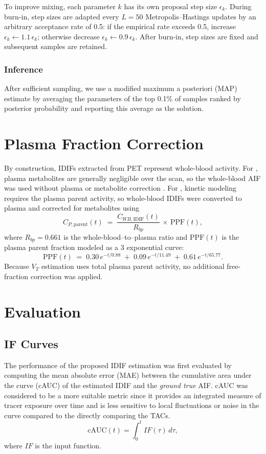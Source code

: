 To improve mixing, each parameter \(k\) has its own proposal step size \(\epsilon_k\).
During burn-in, step sizes are adapted every \(L=50\) Metropolis–Hastings updates by an arbitrary acceptance rate of 0.5: if the empirical rate exceeds 0.5, increase \(\epsilon_k \leftarrow 1.1\,\epsilon_k\); otherwise decrease \(\epsilon_k \leftarrow 0.9\,\epsilon_k\).
After burn-in, step sizes are fixed and subsequent samples are retained.

\subsubsection{Inference}
After sufficient sampling, we use a modified maximum a posteriori (MAP) estimate by averaging the parameters of the top 0.1\% of samples ranked by posterior probability and reporting this average as the solution.
\section{Plasma Fraction Correction}
By construction, IDIFs extracted from PET represent whole-blood activity.
For \fdg, plasma metabolites are generally negligible over the scan, so the whole-blood AIF was used without plasma or metabolite correction \cite{gambhir1989simple}.
For \yohimbine, kinetic modeling requires the plasma parent activity, so whole-blood IDIFs were converted to plasma and corrected for metabolites using
\begin{equation}
	C_{P,\mathrm{parent}}(t) \;=\; \frac{C_{WB,\mathrm{IDIF}}(t)}{R_{bp}} \,\times\, \mathrm{PPF}(t),
\end{equation}
where \(R_{bp}=0.661\) is the whole-blood–to–plasma ratio and \(\mathrm{PPF}(t)\) is the plasma parent fraction modeled as a 3 exponential curve:  \cite{laurencin2021modeling}
\begin{equation}
	\mathrm{PPF}(t) \;=\; 0.30\,e^{-t/0.88} \;+\; 0.09\,e^{-t/11.49} \;+\; 0.61\,e^{-t/65.77}.
\end{equation}
Because \(V_T\) estimation uses total plasma parent activity, no additional free-fraction correction was applied.

\section{Evaluation}

\subsection{IF Curves}
The performance of the proposed IDIF estimation was first evaluated by computing the mean absolute error (MAE) between the cumulative area under the curve (cAUC) of the estimated IDIF and the \textit{ground true} AIF. cAUC was considered to be a more suitable metric since it provides an integrated measure of tracer exposure over time and is less sensitive to local fluctuations or noise in the curve compared to the directly comparing the TACs.
\begin{equation}
	\textrm{cAUC}(t) =  \int_{0}^{t} IF(\tau) \, d\tau,
\end{equation}
where \(IF\) is the input function.

